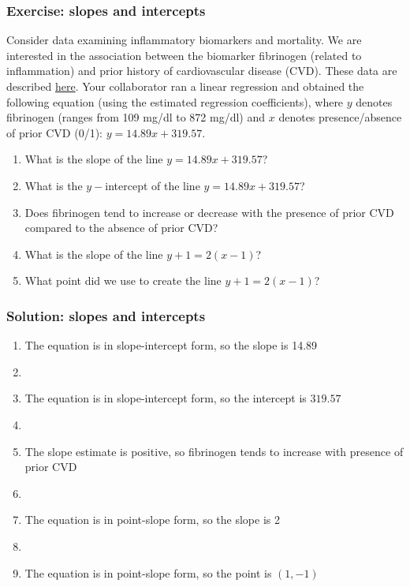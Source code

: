 \documentclass[11pt, hyperref={colorlinks, urlcolor=blue}]{beamer}
\newcommand{\myframe}[1]{\begin{frame} \frametitle{#1}}
\begin{document}
\myframe{Exercise: slopes and intercepts}
Consider data examining inflammatory biomarkers and mortality. We are interested in the association between the biomarker fibrinogen (related to inflammation) and prior history of cardiovascular disease (CVD). These data are described \href{https://www.emersonstatistics.com/datasets/inflamm.doc}{here}. Your collaborator ran a linear regression and obtained the following equation (using the estimated regression coefficients), where $y$ denotes fibrinogen (ranges from 109 mg/dl to 872 mg/dl) and $x$ denotes presence/absence of prior CVD (0/1): $y = 14.89x + 319.57$. \vspace{-0.3cm}
\begin{enumerate}
\item What is the slope of the line $y = 14.89x + 319.57$?
\item What is the $y-$intercept of the line $y = 14.89x + 319.57$?
\item Does fibrinogen tend to increase or decrease with the presence of prior CVD compared to the absence of prior CVD?
\item What is the slope of the line $y + 1 = 2(x - 1)$?
\item What point did we use to create the line $y + 1 = 2(x - 1)$?
\end{enumerate}
\end{frame}

\myframe{Solution: slopes and intercepts}
\begin{enumerate}
\item The equation is in slope-intercept form, so the slope is 14.89
\item[]
\item The equation is in slope-intercept form, so the intercept is $319.57$
\item[]
\item The slope estimate is positive, so fibrinogen tends to increase with presence of prior CVD
\item[]
\item The equation is in point-slope form, so the slope is 2
\item[]
\item The equation is in point-slope form, so the point is $(1, -1)$
\end{enumerate}
\end{frame}
\end{document}
